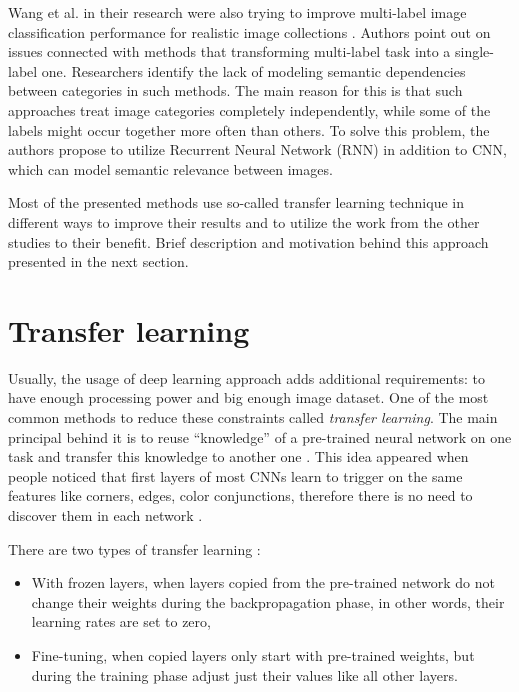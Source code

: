 Wang et al. in their research were also trying to improve multi-label image classification performance for realistic image collections \cite{Wang2016CNN-RNN:Classification}. Authors point out on issues connected with methods that transforming multi-label task into a single-label one. Researchers identify the lack of modeling semantic dependencies between categories in such methods. The main reason for this is that such approaches treat image categories completely independently, while some of the labels might occur together more often than others. To solve this problem, the authors propose to utilize Recurrent Neural Network (RNN) in addition to CNN, which can model semantic relevance between images.

Most of the presented methods use so-called transfer learning technique in different ways to improve their results and to utilize the work from the other studies to their benefit. Brief description and motivation behind this approach presented in the next section.



\section{Transfer learning}
\label{sec:transfer-learning}

Usually, the usage of deep learning approach adds additional requirements: to have enough processing power and big enough image dataset. One of the most common methods to reduce these constraints called \textit{transfer learning}. The main principal behind it is to reuse ``knowledge'' of a pre-trained neural network on one task and transfer this knowledge to another one \cite{Pan2010TransferLearningSurvey, Oquab2014TransferringMidLevel}. This idea appeared when people noticed that first layers of most CNNs learn to trigger on the same features like corners, edges, color conjunctions, therefore there is no need to discover them in each network \cite{Zeiler2014VisualizingNets}.

There are two types of transfer learning \cite{Yosinski2014HowTransferable}:
\begin{itemize}
    \item With frozen layers, when layers copied from the pre-trained network do not change their weights during the backpropagation phase, in other words, their learning rates are set to zero,
    \item Fine-tuning, when copied layers only start with pre-trained weights, but during the training phase adjust just their values like all other layers.
\end{itemize}

